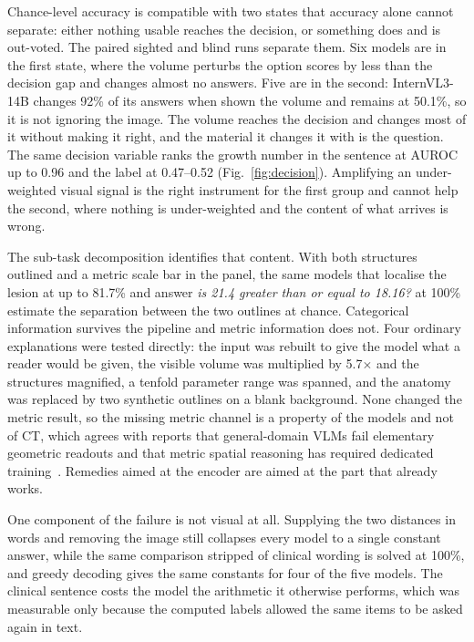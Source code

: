 Chance-level accuracy is compatible with two states that accuracy alone
cannot separate: either nothing usable reaches the decision, or something
does and is out-voted. The paired sighted and blind runs separate them. Six
models are in the first state, where the volume perturbs the option scores
by less than the decision gap and changes almost no answers. Five are in the
second: InternVL3-14B changes 92\% of its answers when shown the volume and
remains at 50.1\%, so it is not ignoring the image. The volume reaches the
decision and changes most of it without making it right, and the material it
changes it with is the question. The same decision variable ranks the growth
number in the sentence at AUROC up to 0.96 and the label at 0.47--0.52
(Fig.~\ref{fig:decision}). Amplifying an under-weighted visual signal is the
right instrument for the first group and cannot help the second, where
nothing is under-weighted and the content of what arrives is wrong.

The sub-task decomposition identifies that content. With both structures
outlined and a metric scale bar in the panel, the same models that localise
the lesion at up to 81.7\% and answer \emph{is 21.4 greater than or equal to
18.16?} at 100\% estimate the separation between the two outlines at chance.
Categorical information survives the pipeline and metric information does
not. Four ordinary explanations were tested directly: the input was rebuilt
to give the model what a reader would be given, the visible volume was
multiplied by 5.7$\times$ and the structures magnified, a tenfold parameter
range was spanned, and the anatomy was replaced by two synthetic outlines on
a blank background. None changed the metric result, so the missing metric
channel is a property of the models and not of CT, which agrees with reports that general-domain VLMs fail elementary
geometric readouts and that metric spatial reasoning has required dedicated
training~\cite{rahmanzadehgervi2024blind}.
Remedies aimed at the encoder are aimed at the part that already works.

One component of the failure is not visual at all. Supplying the two
distances in words and removing the image still collapses every model to a
single constant answer, while the same comparison stripped of clinical
wording is solved at 100\%, and greedy decoding gives the same constants for
four of the five models. The clinical sentence costs the model the
arithmetic it otherwise performs, which was measurable only because the
computed labels allowed the same items to be asked again in text.

